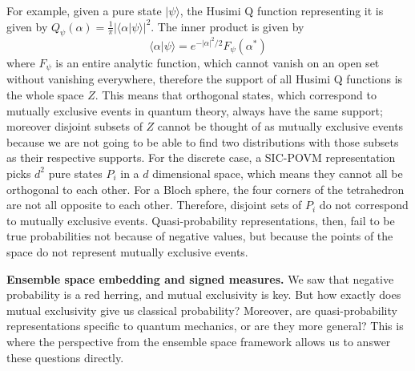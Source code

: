 \documentclass[10pt,twocolumn, nofootinbib]{revtex4-2}
\def\>{\rangle}
\begin{document}
For example, given a pure state $|\psi\>$, the Husimi Q function representing it is given by $Q_\psi(\alpha) = \frac{1}{\pi} |\langle \alpha | \psi \rangle|^2$. The inner product is given by \cite[eq. 11.7-1]{mandel1995}
\begin{equation}
	\langle \alpha | \psi \rangle = e^{-|\alpha|^2/2} F_\psi(\alpha^\ast)
\end{equation}
where $F_\psi$ is an entire analytic function, which cannot vanish on an open set without vanishing everywhere, therefore the support of all Husimi Q functions is the whole space $Z$. This means that orthogonal states, which correspond to mutually exclusive events in quantum theory, always have the same support; moreover disjoint subsets of $Z$ cannot be thought of as mutually exclusive events because we are not going to be able to find two distributions with those subsets as their respective supports. For the discrete case, a SIC-POVM representation picks $d^2$ pure states $P_i$ in a $d$ dimensional space, which means they cannot all be orthogonal to each other. For a Bloch sphere, the four corners of the tetrahedron are not all opposite to each other. Therefore, disjoint sets of $P_i$ do not correspond to mutually exclusive events. Quasi-probability representations, then, fail to be true probabilities not because of negative values, but because the points of the space do not represent mutually exclusive events.


\textbf{Ensemble space embedding and signed measures.} We saw that negative probability is a red herring, and mutual exclusivity is key. But how exactly does mutual exclusivity give us classical probability? Moreover, are quasi-probability representations specific to quantum mechanics, or are they more general? This is where the perspective from the ensemble space framework allows us to answer these questions directly.
\end{document}
